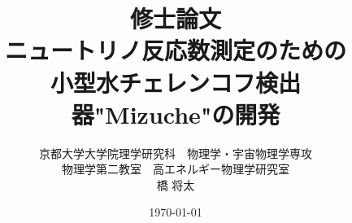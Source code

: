 \documentclass[11pt]{jreport}
\begin{document}
\begin{titlepage}

\title{修士論文\\ニュートリノ反応数測定のための\\小型水チェレンコフ検出器"Mizuche"の開発}
\author{京都大学大学院理学研究科　物理学・宇宙物理学専攻\\
物理学第二教室　高エネルギー物理学研究室\\
橋 将太}
\date{\today}


\end{titlepage}

\maketitle
\end{document}
